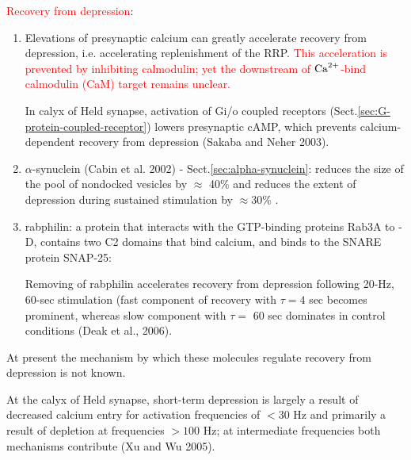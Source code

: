 \textcolor{red}{Recovery from depression}:
\begin{enumerate}
  \item    Elevations of presynaptic calcium can greatly accelerate recovery from
   depression, i.e. accelerating replenishment of the RRP. \textcolor{red}{This
   acceleration is prevented by inhibiting calmodulin; yet the
   downstream of ${\text{Ca}^{2+}}$-bind calmodulin (CaM) target remains unclear.}
  
  In calyx of Held synapse, activation of Gi/o coupled
receptors (Sect.\ref{sec:G-protein-coupled-receptor}) lowers presynaptic cAMP,
which prevents calcium-dependent recovery from depression (Sakaba and Neher
2003).
   
   \label{sec:alpha-synuclein-modify-vesicle}
   \item $\alpha$-synuclein (Cabin et al. 2002) -
   Sect.\ref{sec:alpha-synuclein}: reduces the size of the pool of nondocked
   vesicles by $\approx$  40\% and reduces the extent of depression during
   sustained stimulation by $\approx 30$\% .

   \item rabphilin: a protein that interacts with the GTP-binding proteins Rab3A
   to -D, contains two C2 domains that bind calcium, and binds to the SNARE
   protein SNAP-25:

Removing of rabphilin accelerates recovery from depression
following 20-Hz, 60-sec stimulation (fast
component of recovery with $\tau = 4$ sec becomes
prominent, whereas slow component with $\tau =$
60 sec dominates in control conditions (Deak et al., 2006).

\end{enumerate}

At present the mechanism by which these molecules regulate recovery from
depression is not known.



At the calyx of Held synapse, short-term depression is largely a result of
decreased calcium entry for activation frequencies of $< 30$ Hz and primarily a
result of depletion at frequencies $> 100$ Hz; at intermediate frequencies both
mechanisms contribute (Xu and Wu 2005).

